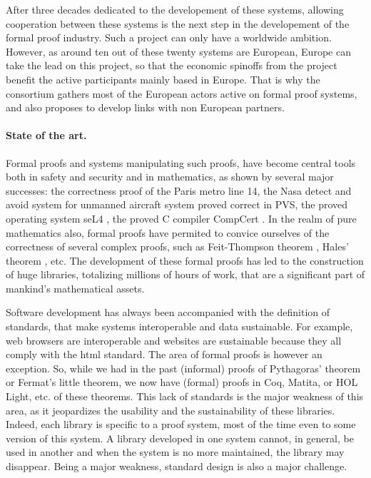 After three decades dedicated to the developement of these systems,
allowing cooperation between these systems is the next step in the
developement of the formal proof industry.
Such a project can only have a worldwide ambition. However, as around
ten out of these twenty systems are European, Europe can take the lead
on this project, so that the economic spinoffs from the project
benefit the active participants mainly based in Europe.
That is why the consortium gathers most of the European actors active
on formal proof systems, and also proposes to develop links with non
European partners.

\paragraph{State of the art.}
Formal proofs and systems manipulating such proofs, have become
central tools both in safety and security and in mathematics, as shown
by several major successes: the correctness proof of the Paris metro
line 14, the Nasa detect and avoid system for unmanned aircraft system
proved correct in PVS, the proved operating system seL4
\cite{Klein09}, the proved C compiler CompCert \cite{Leroy06}.  In the
realm of pure mathematics also, formal proofs have permited to convice
ourselves of the correctness of several complex proofs, such as
Feit-Thompson theorem \cite{Gonthier13}, Hales' theorem
\cite{Hales17}, etc.  The development of these formal proofs has led
to the construction of huge libraries, totalizing millions of hours of
work, that are a significant part of mankind's mathematical assets.

Software development has always been accompanied with the definition
of standards, that make systems interoperable and data
sustainable. For example, web browsers are interoperable and websites
are sustainable because they all comply with the html standard. The
area of formal proofs is however an exception. So, while we had in the
past (informal) proofs of Pythagoras' theorem or Fermat's little
theorem, we now have (formal) proofs in {\sc Coq}, {\sc Matita}, or
{\sc HOL Light}, etc. of these theorems. This lack of standards is
the major weakness of this area, as it jeopardizes the usability and
the sustainability of these libraries. Indeed, each library is
specific to a proof system, most of the time even to some version of
this system. A library developed in one system cannot, in general, be
used in another and when the system is no more maintained, the library
may disappear. Being a major weakness, standard design is also a major
challenge.

